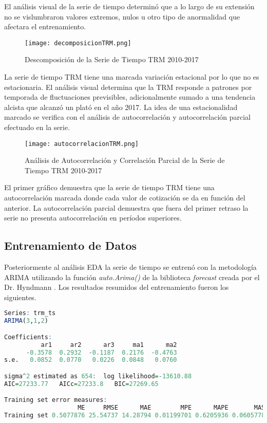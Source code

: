 El análisis visual de la serie de tiempo determinó que a lo largo de su extensión no se vislumbraron valores extremos, nulos u otro tipo de anormalidad que afectara el entrenamiento. 

\begin{figure}[h!]
    \centering
    \texttt{[image: decomposicionTRM.png]}
    \caption{Descomposición de la Serie de Tiempo TRM 2010-2017}
\end{figure}   

La serie de tiempo TRM tiene una marcada variación estacional por lo que no es estacionaria. El análisis visual determina que la TRM responde a patrones por temporada de fluctuaciones previsibles, adicionalmente sumado a una tendencia alcista que alcanzó un plató en el año 2017. La idea de una estacionalidad marcado se verifica con el análisis de autocorrelación y autocorrelación parcial efectuado en la serie. 

\begin{figure}[H]
    \centering
    \texttt{[image: autocorrelacionTRM.png]}
    \caption{Análisis de Autocorrelación y Correlación Parcial de la Serie de Tiempo TRM 2010-2017}
\end{figure}   

El primer gráfico demuestra que la serie de tiempo TRM tiene una autocorrelación marcada donde cada valor de cotización se da en función del anterior. La autocorrelación parcial demuestra que fuera del primer retraso la serie no presenta autocorrelación en períodos superiores. 

\subsection{Entrenamiento de Datos}
Posteriormente al análisis EDA la serie de tiempo se entrenó con la metodología ARIMA utilizando la función \emph{auto.Arima()} de la biblioteca \emph{forecast} creada por el Dr. Hyndmann \cite{hyndman}. Los resultados resumidos del entrenamiento fueron los siguientes. 

\begin{lstlisting}[language=R]
Series: trm_ts 
ARIMA(3,1,2) 

Coefficients:
          ar1     ar2      ar3     ma1      ma2
      -0.3578  0.2932  -0.1187  0.2176  -0.4763
s.e.   0.0852  0.0770   0.0226  0.0848   0.0760

sigma^2 estimated as 654:  log likelihood=-13610.88
AIC=27233.77   AICc=27233.8   BIC=27269.65

Training set error measures:
                    ME     RMSE      MAE        MPE      MAPE       MASE         ACF1
Training set 0.5077876 25.54737 14.28794 0.01199701 0.6205936 0.06057789 0.0001886243
\end{lstlisting}

